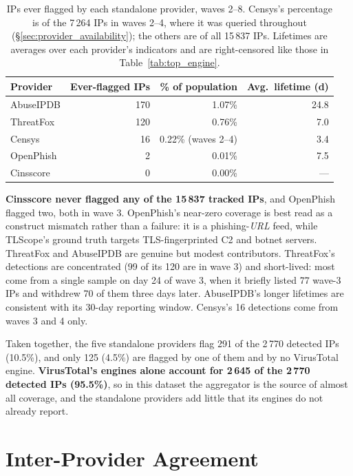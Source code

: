 \begin{table}[h]
  \centering
  \caption{IPs ever flagged by each standalone provider, waves 2--8. Censys's percentage is of the
    7\,264 IPs in waves 2--4, where it was queried throughout (\S\ref{sec:provider_availability}); the
    others are of all 15\,837 IPs. Lifetimes are averages over each provider's indicators and are
    right-censored like those in Table~\ref{tab:top_engine}.}
  \label{tab:provider_coverage}
  \small
  \begin{tabular}{lrrr}
    \toprule
    \textbf{Provider} & \textbf{Ever-flagged IPs} & \textbf{\% of population} & \textbf{Avg.\ lifetime (d)} \\
    \midrule
    AbuseIPDB  & 170 & 1.07\%                  & 24.8 \\
    ThreatFox  & 120 & 0.76\%                  & 7.0  \\
    Censys     & 16  & 0.22\% (waves 2--4)     & 3.4  \\
    OpenPhish  & 2   & 0.01\%                  & 7.5  \\
    Cinsscore  & 0   & 0.00\%                  & ---  \\
    \bottomrule
  \end{tabular}
\end{table}

\textbf{Cinsscore never flagged any of the 15\,837 tracked IPs}, and OpenPhish flagged two, both in
wave 3. OpenPhish's near-zero coverage is best read as a construct mismatch rather than a failure:
it is a phishing-\emph{URL} feed, while TLScope's ground truth targets TLS-fingerprinted C2 and
botnet servers. ThreatFox and AbuseIPDB are genuine but modest contributors. ThreatFox's detections
are concentrated (99 of its 120 are in wave 3) and short-lived: most come from a single sample on
day 24 of wave 3, when it briefly listed 77 wave-3 IPs and withdrew 70 of them three days later.
AbuseIPDB's longer lifetimes are consistent with its 30-day reporting window. Censys's 16 detections
come from waves 3 and 4 only.

Taken together, the five standalone providers flag 291 of the 2\,770 detected IPs (10.5\%), and only
125 (4.5\%) are flagged by one of them and by no VirusTotal engine. \textbf{VirusTotal's engines
alone account for 2\,645 of the 2\,770 detected IPs (95.5\%)}, so in this dataset the aggregator is
the source of almost all coverage, and the standalone providers add little that its engines do not
already report.

\section{Inter-Provider Agreement}
\label{sec:agreement}

